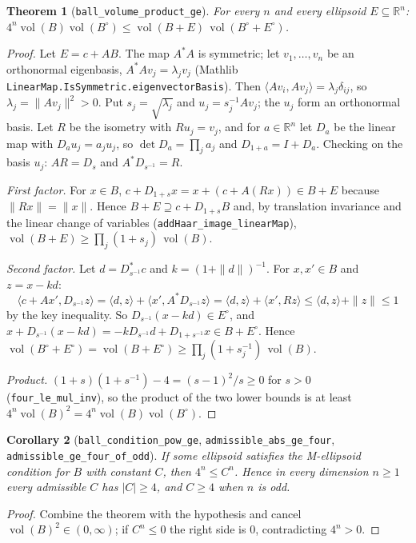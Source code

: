 \documentclass[11pt]{article}
\newtheorem{theorem}{Theorem}
\newtheorem{corollary}[theorem]{Corollary}
\theoremstyle{definition}
\newcommand{\vol}{\operatorname{vol}}
\newcommand{\ip}[2]{\langle #1,#2\rangle}
\begin{document}
\begin{theorem}[\texttt{ball\_volume\_product\_ge}]
For every $n$ and every ellipsoid $E\subseteq\mathbb{R}^n$:
$4^n\vol(B)\vol(B^\circ)\le\vol(B+E)\,\vol(B^\circ+E^\circ)$.
\end{theorem}
\begin{proof}
Let $E=c+AB$. The map $A^*A$ is symmetric; let $v_1,\dots,v_n$ be an orthonormal eigenbasis,
$A^*Av_j=\lambda_jv_j$ (Mathlib \texttt{LinearMap.IsSymmetric.eigenvectorBasis}). Then
$\ip{Av_i}{Av_j}=\lambda_j\delta_{ij}$, so $\lambda_j=\|Av_j\|^2>0$. Put $s_j=\sqrt{\lambda_j}$ and
$u_j=s_j^{-1}Av_j$; the $u_j$ form an orthonormal basis. Let $R$ be the isometry with $Ru_j=v_j$,
and for $a\in\mathbb{R}^n$ let $D_a$ be the linear map with $D_au_j=a_ju_j$, so
$\det D_a=\prod_j a_j$ and $D_{1+a}=I+D_a$. Checking on the basis $u_j$:
$A R=D_s$ and $A^*D_{s^{-1}}=R$.

\emph{First factor.} For $x\in B$, $c+D_{1+s}x=x+(c+A(Rx))\in B+E$ because $\|Rx\|=\|x\|$. Hence
$B+E\supseteq c+D_{1+s}B$ and, by translation invariance and the linear change of variables
(\texttt{addHaar\_image\_linearMap}), $\vol(B+E)\ge\prod_j(1+s_j)\,\vol(B)$.

\emph{Second factor.} Let $d=D_{s^{-1}}^*c$ and $k=(1+\|d\|)^{-1}$. For $x,x'\in B$ and
$z=x-kd$:
\[
 \ip{c+Ax'}{D_{s^{-1}}z}=\ip{d}{z}+\ip{x'}{A^*D_{s^{-1}}z}=\ip{d}{z}+\ip{x'}{Rz}
 \le\ip{d}{z}+\|z\|\le1
\]
by the key inequality. So $D_{s^{-1}}(x-kd)\in E^\circ$, and
$x+D_{s^{-1}}(x-kd)=-kD_{s^{-1}}d+D_{1+s^{-1}}x\in B+E^\circ$. Hence
$\vol(B^\circ+E^\circ)=\vol(B+E^\circ)\ge\prod_j(1+s_j^{-1})\,\vol(B)$.

\emph{Product.} $(1+s)(1+s^{-1})-4=(s-1)^2/s\ge0$ for $s>0$
(\texttt{four\_le\_mul\_inv}), so the product of the two lower bounds is at least
$4^n\vol(B)^2=4^n\vol(B)\vol(B^\circ)$.
\end{proof}

\begin{corollary}[\texttt{ball\_condition\_pow\_ge}, \texttt{admissible\_abs\_ge\_four},
\texttt{admissible\_ge\_four\_of\_odd}]
If some ellipsoid satisfies the M-ellipsoid condition for $B$ with constant $C$, then
$4^n\le C^n$. Hence in every dimension $n\ge1$ every admissible $C$ has $|C|\ge4$, and $C\ge4$ when
$n$ is odd.
\end{corollary}
\begin{proof}
Combine the theorem with the hypothesis and cancel $\vol(B)^2\in(0,\infty)$; if $C^n\le0$ the
right side is $0$, contradicting $4^n>0$.
\end{proof}
\end{document}

